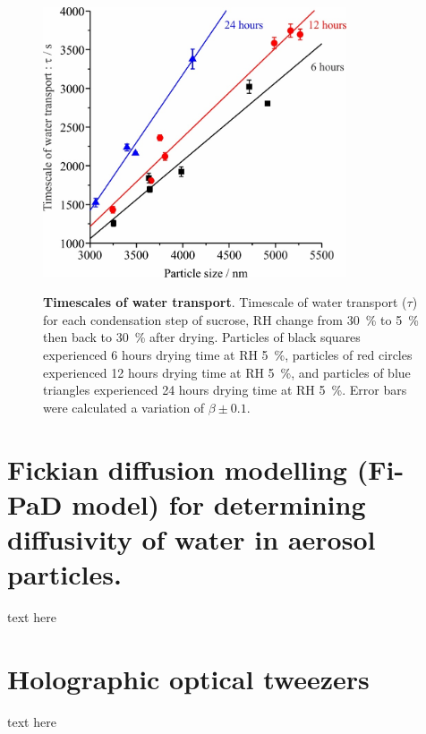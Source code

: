 \begin{figure}
    \centering
    \caption{\textbf{Timescales of water transport}. Timescale of water transport ($\tau$) for each condensation step of sucrose, RH change from \SI{30}{\percent} to \SI{5}{\percent} then back to \SI{30}{\percent} after drying. Particles of black squares experienced 6 hours drying time at RH \SI{5}{\percent}, particles of red circles experienced 12 hours drying time at RH \SI{5}{\percent}, and particles of blue triangles experienced 24 hours drying time at RH \SI{5}{\percent}. Error bars were calculated a variation of $\beta \pm \num{0.1}$. }
    \includegraphics[width=0.8\textwidth]{chapters/water_hopping/figures/image006.jpg}
    \label{fig:wat_s4}
\end{figure}

\section{Fickian diffusion modelling (Fi-PaD model) for determining diffusivity of water in aerosol particles.}

text here

\section{Holographic optical tweezers}

text here

